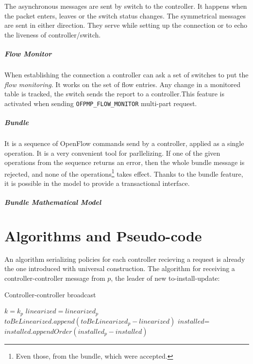 \documentclass{article}
\theoremstyle{remark}
\begin{document}
The asynchronous messages are sent by switch to the controller. It happens when the packet enters, leaves or the switch status changes.  The symmetrical messages are sent in either direction. They serve while setting up the connection or to echo the liveness of controller/switch. 
\subparagraph{Flow Monitor}  When establishing the connection a controller can ask a set of switches to put the \emph{flow monitoring}. It works on the set of flow entries. Any change in a monitored table is tracked, the switch sends the report to a controller.This feature is activated when sending 
\texttt{OFPMP\_FLOW\_MONITOR} multi-part request.  
\subparagraph{Bundle} It is a sequence of OpenFlow commands send by a 
controller, applied as a single operation. It is a very convenient tool for parllelizing. If one of the given operations from the sequence returns an error, then the whole bundle message is rejected, and none of the operations\footnote{Even those, from the bundle, which were accepted.} takes effect. 
Thanks to the bundle feature, it is possible in the model to provide a transactional interface.
\subparagraph{Bundle Mathematical Model}

\section{Algorithms and Pseudo-code}

%
An algorithm serializing policies for each controller recieving a request is already the one introduced with universal construction.
The algorithm for receiving a controller-controller message from $p$, the leader of new to-install-update:
\begin{algorithm}
\caption{Controller-controller broadcast}\label{BroadcastCC}
  \begin{algorithmic}[1]
     $k=k_p$
    \EndIf
     $linearized = linearized_p$
    \EndIf
    \State $toBeLinearized.append(toBeLinearized_p-linearized)$
    \State $installed$=$installed.appendOrder(installed_p-installed)$
    \EndProcedure
  \end{algorithmic}
\end{algorithm}
\end{document}
